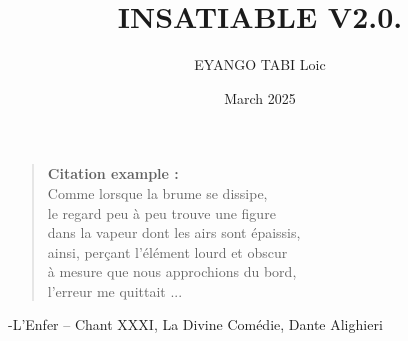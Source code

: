 \documentclass[a4paper,12pt,twoside,english]{book}
\title{INSATIABLE V2.0.}
\author{EYANGO TABI Loic}
\date{March 2025}
\begin{document}
    \begin{titlepage}
        \newpage %
        \thispagestyle{empty} %
    \end{titlepage}
    
\renewcommand{\chaptermark}[1]{\markboth{#1}{}}
\frontmatter %


\clearpage
\vspace*{0.2\textheight}

\begin{quote}
\textbf{Citation example :} \\
Comme lorsque la brume se dissipe, \\ le regard peu à peu trouve une figure\\ dans la vapeur dont les airs sont épaissis, \\ ainsi, perçant l'élément lourd et obscur\\ à mesure que nous approchions du bord, \\l'erreur me quittait ...
\end{quote} \bigbreak

\hfill 
-L’Enfer – Chant XXXI, La Divine Comédie, Dante Alighieri






\end{document}
